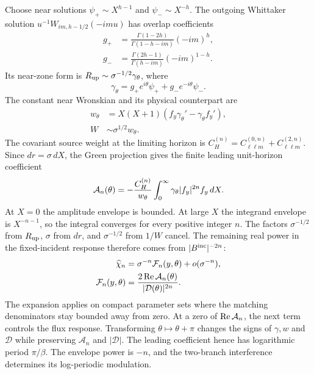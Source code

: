 Choose near solutions $\psi_+\sim X^{h-1}$ and $\psi_-\sim X^{-h}$.
The outgoing Whittaker solution $u^{-1}W_{im,h-1/2}(-imu)$ has overlap
coefficients
\begin{align}
g_+&=\frac{\Gamma(1-2h)}{\Gamma(1-h-im)}(-im)^h,\nonumber\\
g_-&=\frac{\Gamma(2h-1)}{\Gamma(h-im)}(-im)^{1-h}.
\end{align}
Its near-zone form is $R_{\rm up}\sim\sigma^{-1/2}\gamma_\theta$, where
\begin{equation}
\gamma_\theta=g_+e^{i\theta}\psi_++g_-e^{-i\theta}\psi_-.
\end{equation}
The constant near Wronskian and its physical counterpart are
\begin{align}
w_\theta&=X(X+1)(f_y\gamma_\theta'-\gamma_\theta f_y'),\nonumber\\
W&\sim\sigma^{1/2}w_\theta.
\end{align}
The covariant source weight at the limiting horizon is
$C_H^{(n)}=C^{(0,n)}_{\ell\ell m}+C^{(2,n)}_{\ell\ell m}$.
Since $dr=\sigma\,dX$, the Green projection gives the finite leading
unit-horizon coefficient
\begin{equation}
{\cal A}_n(\theta)=-\frac{C_H^{(n)}}{w_\theta}
\int_0^\infty\gamma_\theta|f_y|^{2n}f_y\,dX.
\label{eq:principal-source-integral}
\end{equation}
At $X=0$ the amplitude envelope is bounded.  At large $X$ the integrand
envelope is $X^{-n-1}$, so the integral converges for every positive integer
$n$.  The factors $\sigma^{-1/2}$ from $R_{\rm up}$, $\sigma$ from $dr$,
and $\sigma^{-1/2}$ from $1/W$ cancel.  The remaining real power in the
fixed-incident response therefore comes from $|B^{\rm inc}|^{-2n}$:
\begin{align}
\widehat\chi_n&=\sigma^{-n}{\cal F}_n(y,\theta)+o(\sigma^{-n}),\nonumber\\
{\cal F}_n(y,\theta)&=\frac{2\operatorname{Re}{\cal A}_n(\theta)}
{|{\cal D}(\theta)|^{2n}}.
\label{eq:principal-law}
\end{align}
The expansion applies on compact parameter sets where the matching
denominators stay bounded away from zero.  At a zero of
$\operatorname{Re}{\cal A}_n$, the next term controls the flux response.
Transforming $\theta\mapsto\theta+\pi$ changes the signs of $\gamma,w$ and
$\mathcal D$ while preserving $\mathcal A_n$ and $|\mathcal D|$.
The leading coefficient hence has logarithmic period $\pi/\beta$.
The envelope power is $-n$, and the two-branch interference determines its
log-periodic modulation.

